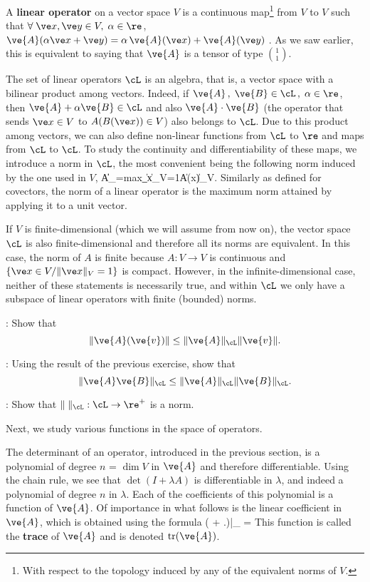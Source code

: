 
A {\bf linear operator}  
 on a vector space $V$ is a continuous map\footnote{With respect to the topology induced by any of the equivalent norms of $V$.}
from $V$ to $V$ such that $\forall \; \ve x,\ve y \in V,\; \alpha \in \re$, 
$\ve{A}(\alpha \ve x+ \ve y)=\alpha\,\ve{A}(\ve x) + \ve{A}(\ve y)\;$. As we saw earlier, this is equivalent to saying that $\ve{A}$ is a tensor of type ${1 \choose 1}$.

The set of linear operators
$\cL$ is an algebra, that is, a vector space with a bilinear product among vectors.
Indeed, if $\ve{A}\,,\;\ve{B}\in \cL\,,\;\alpha\in \re$, 
then $\ve{A}+\alpha\ve{B}\in\cL$ and also 
$\ve{A}\cdot\ve{B}$ (the operator that sends $\ve x\in V$ 
to $A(B(\ve x)) \in V$) also belongs to $\cL$.
Due to this product among vectors, we can also define non-linear functions from $\cL$ to $\re$ and maps from $\cL$ to $\cL$. To study the continuity and differentiability of these maps, we introduce a norm in $\cL$, the most convenient being the following norm induced by the one used in $V$,
\beq
\|A\|_{\cL}=\mbox{max}_{\|\ve x\|_V=1}\|A(\ve x)\|_V.
\eeq
Similarly as defined for covectors, the norm of a linear operator is the maximum norm attained by applying it to a unit vector.

If $V$ is finite-dimensional (which we will assume from now on), 
the vector space $\cL$ is also finite-dimensional and therefore all its norms are equivalent. In this case, the norm of $A$ is finite because 
$A:V\to V$ is continuous and $\{\ve x\in V/\|\ve x\|_V=1\}$ is compact. However, in the infinite-dimensional case, neither of these statements is necessarily true, and within $\cL$ we only have a subspace of linear operators with finite (bounded) norms.
\espa

\ejer: Show that 
\[
\|\ve{A}(\ve{v})\| \leq \|\ve{A}\|_{\cL} \|\ve{v}\|.
\]
\espa

\ejer: Using the result of the previous exercise, show that 
\[
\|\ve{A}\ve{B}\|_{\cL} \leq \|\ve{A}\|_{\cL}\|\ve{B}\|_{\cL}.
\]
\espa

\ejer:
Show that $\|\;\|_{\cL}:\cL\to \re^+$ is a norm.
\espa

Next, we study various functions in the space of operators.
\espa

The determinant of an operator, introduced in the previous section, is a polynomial of degree $n$ = $\dim V$ in $\ve{A}$ and therefore differentiable. Using the chain rule, we see that
$\det (I+\lambda A)$ is differentiable in $\lambda$, and indeed a polynomial
of degree $n$ in $\lambda$. Each of the coefficients of this
polynomial is a function of $\ve{A}$. Of importance in what
follows is the linear coefficient in $\ve{A}$, which is obtained using the
formula
\beq
\der{\lambda} \det( + \left.\lambda {})\right|_{} =
\dip{}
\label{eqn:2_traza}
\eeq
\noi This function is called the {\bf trace}  of 
$\ve{A}$ and is denoted $\text{tr} (\ve{A})$. 

